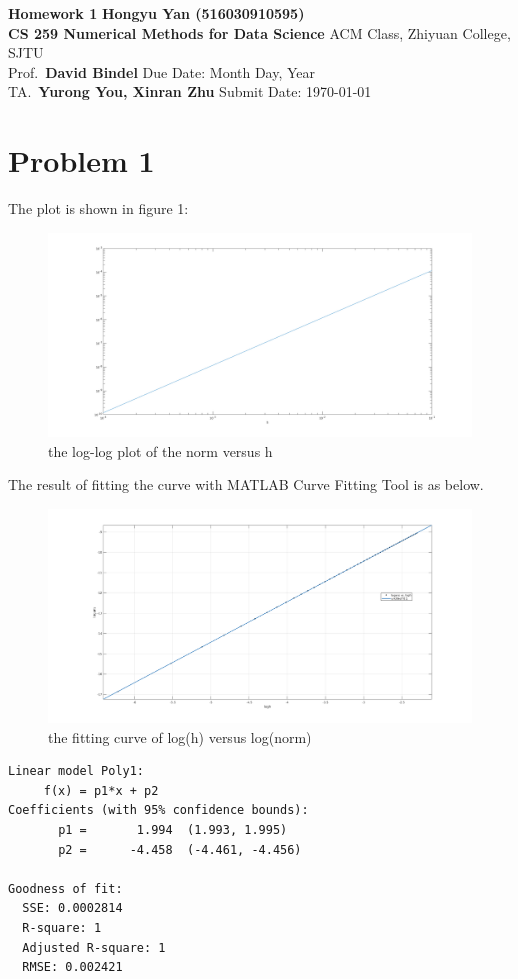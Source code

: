 \documentclass[a4paper, 11pt]{article}
\begin{document}
\noindent
\large\textbf{Homework 1} \hfill \textbf{Hongyu Yan (516030910595)} \\
\normalsize {\bf CS 259 Numerical Methods for Data Science} \hfill ACM Class, Zhiyuan College, SJTU\\
Prof.~{\bf David Bindel} \hfill Due Date: Month Day, Year\\
TA.~{\bf Yurong You, Xinran Zhu} \hfill Submit Date: \today

\section*{Problem 1}
The plot is shown in figure 1:

\begin{figure}[ht]
\centering
\includegraphics[scale=0.3]{figure/problem1.png}
\caption{the log-log plot of the norm versus h}
\label{fig1}
\end{figure}

The result of fitting the curve with MATLAB Curve Fitting Tool is as below.
\begin{figure}[ht]
\centering
\includegraphics[scale=0.3]{figure/problem1_fit.png}
\caption{the fitting curve of log(h) versus log(norm)}
\label{fig2}
\end{figure}
\lstset{
	language=bash,
	xleftmargin=3em,
}
\begin{lstlisting}
Linear model Poly1:
     f(x) = p1*x + p2
Coefficients (with 95% confidence bounds):
       p1 =       1.994  (1.993, 1.995)
       p2 =      -4.458  (-4.461, -4.456)

Goodness of fit:
  SSE: 0.0002814
  R-square: 1
  Adjusted R-square: 1
  RMSE: 0.002421
\end{lstlisting}
\end{document}
